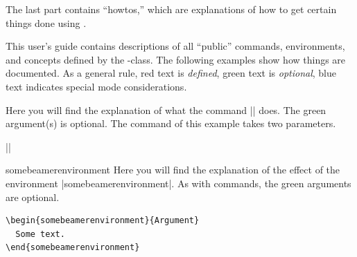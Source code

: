 The last part contains ``howtos,'' which are explanations of how to get certain things done using \beamer.

\medskip
\noindent
This user's guide contains descriptions of all ``public'' commands, environments, and concepts defined by the \beamer-class. The following examples show how things are documented. As a general rule, red text is \emph{defined}, green text is \emph{optional}, blue text indicates special mode considerations.

\begingroup
\noindexing
\begin{command}{\somebeamercommand{}}
  Here you will find the explanation of what the command |\somebeamercommand| does. The green argument(s) is optional. The command of this example takes two parameters.

  \example
  ||
\end{command}

\begin{environment}{{somebeamerenvironment}}
  Here you will find the explanation of the effect of the environment |somebeamerenvironment|. As with commands, the green arguments are optional.
  \example
\begin{verbatim}
\begin{somebeamerenvironment}{Argument}
  Some text.
\end{somebeamerenvironment}
\end{verbatim}
\end{environment}

